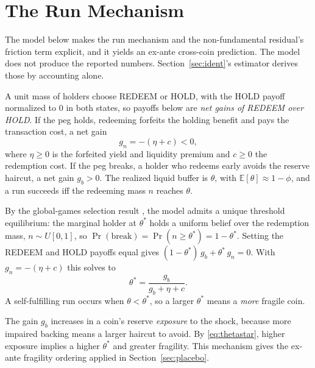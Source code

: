 \section{The Run Mechanism}
\label{app:model}

The model below makes the run mechanism and the non-fundamental residual's friction term
explicit, and it yields an ex-ante cross-coin
prediction. The model does not produce the reported numbers. Section~\ref{sec:ident}'s
estimator derives those by accounting alone.

A unit mass of holders choose REDEEM or HOLD, with the HOLD payoff normalized to $0$ in
both states, so payoffs below are \emph{net gains of REDEEM over HOLD}. If the peg holds,
redeeming forfeits the holding benefit and pays the transaction cost, a net gain
\begin{equation}
g_n = -(\eta + c) < 0,
\end{equation}
where $\eta\ge 0$ is the forfeited yield and liquidity premium and $c\ge 0$ the redemption
cost. If the peg breaks, a holder who redeems early avoids the reserve haircut, a net gain
$g_b>0$. The realized liquid buffer is $\theta$, with $\mathbb{E}[\theta]\approx 1-\phi$,
and a run succeeds iff the redeeming mass $n$ reaches $\theta$.

By the global-games selection result
\cite{carlssonvandamme1993,morrisshin1998,goldsteinpauzner2005}, the model admits a unique
threshold equilibrium: the marginal holder at $\theta^*$ holds a uniform belief over the
redemption mass, $n\sim U[0,1]$, so $\Pr(\text{break})=\Pr(n\ge\theta^*)=1-\theta^*$.
Setting the REDEEM and HOLD payoffs equal gives $(1-\theta^*)\,g_b + \theta^*\,g_n = 0$.
With $g_n=-(\eta+c)$ this solves to
\begin{equation}
\theta^* = \dfrac{g_b}{g_b + \eta + c}.
\label{eq:thetastar}
\end{equation}
A self-fulfilling run occurs when $\theta<\theta^*$, so a larger $\theta^*$ means a
\emph{more} fragile coin.

The gain $g_b$ increases in a coin's reserve \emph{exposure} to the shock,
because more impaired backing means a larger haircut to avoid. By \eqref{eq:thetastar},
higher exposure implies a higher $\theta^*$ and greater fragility. This mechanism gives
the ex-ante fragility ordering applied in Section~\ref{sec:placebo}.

